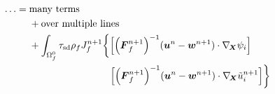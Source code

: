 \documentclass{article}
\newcommand{\bs}[1]{\boldsymbol{#1}}
\newcommand{\Grad}{\nabla_{\!\bs{X}}}
\begin{document}
\begin{equation}
    \begin{aligned}
        \ldots ={}& \text{many terms} \\
        & + \text{over multiple lines} \\
        & + \int_{\Omega_f^0}\tau_\mathrm{sd}\rho_f J_f^{n+1}\biggl\{
            \Bigl[{\Bigl(\bs{F}_f^{n+1}\Bigr)}^{-1}(\bs{u}^n-\bs{w}^{n+1})\cdot\Grad\psi_i\Bigr]
            \\
        & \hphantom{+ \int_{\Omega_f^0}\tau_\mathrm{sd}\rho_f J_f^{n+1}\biggl\{\ }
            \Bigl[{\Bigl(\bs{F}_f^{n+1}\Bigr)}^{-1}(\bs{u}^n-\bs{w}^{n+1})\cdot\Grad\tilde{u}_i^{n+1}\Bigr]
            \biggr\}
    \end{aligned}
\end{equation}
\end{document}
